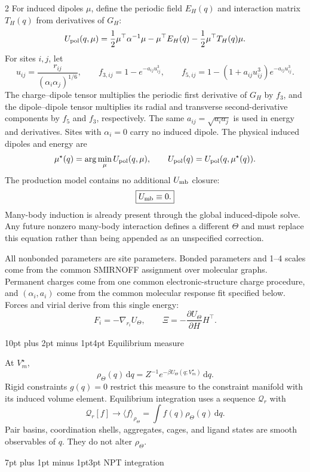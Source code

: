 \documentclass[10pt]{article}
\makeatletter
\renewcommand\section{\@startsection{section}{1}{0pt}%
  {10pt plus 2pt minus 1pt}{4pt}%
  {\large\sffamily\bfseries\color{lithioxfontgreen}}}
\renewcommand\subsection{\@startsection{subsection}{2}{0pt}%
  {7pt plus 1pt minus 1pt}{3pt}%
  {\normalsize\sffamily\bfseries\color{lithioxfontblue}}}
\newcommand{\dd}{\,\mathrm d}
\makeatother
\begin{document}
\begin{multicols}{2}
For induced dipoles \(\mu\), define the periodic field \(E_H(q)\) and interaction
matrix \(T_H(q)\) from derivatives of \(G_H\):
\[
U_{\rm pol}(q,\mu)=
\frac12\mu^\top\alpha^{-1}\mu-\mu^\top E_H(q)
-\frac12\mu^\top T_H(q)\mu.
\]
For sites \(i,j\), let
\[
u_{ij}=\frac{r_{ij}}{(\alpha_i\alpha_j)^{1/6}},\qquad
f_{3,ij}=1-e^{-a_{ij}u_{ij}^3},\qquad
f_{5,ij}=1-(1+a_{ij}u_{ij}^3)e^{-a_{ij}u_{ij}^3}.
\]
The charge--dipole tensor multiplies the periodic first derivative of \(G_H\)
by \(f_3\), and the dipole--dipole tensor multiplies its radial and transverse
second-derivative components by \(f_5\) and \(f_3\), respectively.  The same
\(a_{ij}=\sqrt{a_ia_j}\) is used in energy and derivatives.  Sites with
\(\alpha_i=0\) carry no induced dipole.  The physical induced dipoles and energy are
\[
\mu^\star(q)=\arg\min_\mu U_{\rm pol}(q,\mu),\qquad
U_{\rm pol}(q)=U_{\rm pol}(q,\mu^\star(q)).
\]
The production model contains no additional \(U_{\rm mb}\) closure:
\[
\boxed{U_{\rm mb}\equiv0.}
\]
Many-body induction is already present through the global induced-dipole solve.
Any future nonzero many-body interaction defines a different \(\Theta\) and must
replace this equation rather than being appended as an unspecified correction.

All nonbonded parameters are site parameters.  Bonded parameters and 1--4 scales
come from the common SMIRNOFF assignment over molecular graphs.  Permanent charges
come from one common electronic-structure charge procedure, and
\((\alpha_i,a_i)\) come from the common molecular response fit specified below.
Forces and virial derive from this single energy:
\[
F_i=-\nabla_{r_i}U_\Theta,\qquad
\Xi=-\frac{\partial U_\Theta}{\partial H}H^\top.
\]

\section{Equilibrium measure}

At \(V_m^\star\),
\[
\boxed{
\rho_\Theta(q)\dd q=
Z^{-1}e^{-\beta U_\Theta(q;V_m^\star)}\dd q.}
\]
Rigid constraints \(g(q)=0\) restrict this measure to the constraint manifold with its
induced volume element. Equilibrium integration uses a sequence \(\mathcal Q_r\) with
\[
\mathcal Q_r[f]\longrightarrow
\langle f\rangle_{\rho_\Theta}
=\int f(q)\rho_\Theta(q)\dd q.
\]
Pair basins, coordination shells, aggregates, cages, and ligand states are smooth
observables of \(q\). They do not alter \(\rho_\Theta\).

\subsection{NPT integration}


\end{multicols}
\end{document}
